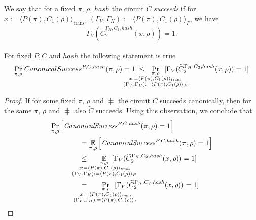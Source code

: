 We say that for a fixed $\pi$, $\rho$, $hash$ the circuit $\widetilde{C}$ \textit{succeeds} if
for $x := \langle P(\pi), C_1(\rho) \rangle_{\text{trans}}$,
$(\Gamma_V, \Gamma_H) := \langle P(\pi), C_1(\rho) \rangle_{P}$, we have
\begin{align*}
\Gamma_V(\widetilde{C}_2^{\Gamma_H, C_2, hash}(x, \rho)) = 1.
\end{align*}
%
\begin{lemma}
  \label{lemma:ctilda_c}
  For fixed $P, C$ and $hash$ the following statement is true
  \begin{align*}
    \underset{\pi, \rho}{\Pr}[CanonicalSuccess^{P, C, hash}(\pi, \rho) = 1]
    \leq
    \mkern13mu
    \underset{
      \mathclap{
      \substack{
        \pi, \rho \\
        x := \langle P(\pi), C_1(\rho) \rangle_{\text{trans}} \\
        (\Gamma_V, \Gamma_H) := \langle P(\pi), C_1(\rho) \rangle_{P}
      }}} {\Pr}\mkern13mu[\Gamma_V(\widetilde{C}_2^{\Gamma_H, C_2, hash}(x, \rho)) = 1]
  \end{align*}
\end{lemma}
%
\begin{proof}
If for some fixed $\pi$, $\rho$ and $\hash$ the circuit $C$ succeeds canonically, then for the same $\pi$, $\rho$ and $\hash$ also $\widetilde{C}$ succeeds.
Using this observation, we conclude that
\begin{align*}
  &\underset{\pi, \rho}{\Pr}\left[\CanonicalSuccess^{P, C, \hash}(\pi, \rho) = 1\right] \\
  &\IndII = \underset{\pi, \rho}{\mathbb{E}}\left[\CanonicalSuccess^{P, C, hash}(\pi, \rho) = 1 \right] \\
  &\IndII \leq
  \mkern33mu
    \underset{
      \mathclap{
        \substack{\pi, \rho \\
        x := \langle P(\pi), C_1(\rho) \rangle_{\mathit{trans}} \\
        (\Gamma_V, \Gamma_H) := \langle P(\pi), C_1(\rho) \rangle_{P}
      }}}
    {\mathbb{E}}\mkern13mu[\Gamma_V(\widetilde{C}_2^{\Gamma_H, C_2, hash}(x, \rho)) = 1] \\
  &\IndII =
  \mkern33mu
    \underset{
      \mathclap{
        \substack{\pi, \rho \\
        x := \langle P(\pi), C_1(\rho) \rangle_{\mathit{trans}} \\
        (\Gamma_V, \Gamma_H) := \langle P(\pi), C_1(\rho) \rangle_{P}
      }}}
    {\Pr}\mkern13mu[\Gamma_V(\widetilde{C}_2^{\Gamma_H, C_2, \hash}(x, \rho)) = 1]
\end{align*}
\end{proof}
